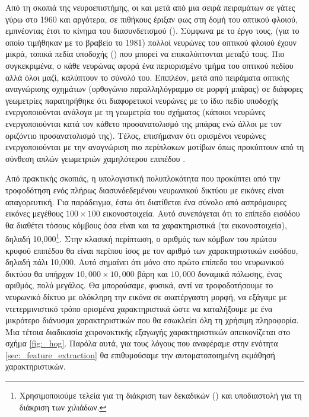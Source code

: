 Από τη σκοπιά της νευροεπιστήμης, οι  και  μετά από μια σειρά πειραμάτων σε γάτες \cite{hubel1959single, hubel1959receptive} γύρω στο 1960 και αργότερα, σε πιθήκους \cite{hubel1968receptive} έριξαν φως στη δομή του οπτικού φλοιού, εμπνέοντας έτσι το κίνημα του διασυνδετισμού (). Σύμφωνα με το έργο τους, (για το οποίο τιμήθηκαν με το βραβείο  το 1981) πολλοί νευρώνες του οπτικού φλοιού έχουν μικρά, τοπικά πεδία υποδοχής () που μπορεί να επικαλύπτονται μεταξύ τους. Πιο συγκεκριμένα, ο κάθε νευρώνας αφορά ένα περιορισμένο τμήμα του οπτικού πεδίου αλλά όλοι μαζί, καλύπτουν το σύνολό του. Επιπλέον, μετά από πειράματα οπτικής αναγνώρισης σχημάτων (ορθογώνιο παραλληλόγραμμο σε μορφή μπάρας) σε διάφορες γεωμετρίες παρατηρήθηκε ότι διαφορετικοί νευρώνες με το ίδιο πεδίο υποδοχής ενεργοποιούνται ανάλογα με τη γεωμετρία του σχήματος (κάποιοι νευρώνες ενεργοποιούνται κατά τον κάθετο προσανατολισμό της μπάρας ενώ άλλοι με τον οριζόντιο προσανατολισμό της). Τέλος, επισήμαναν ότι ορισμένοι νευρώνες ενεργοποιούνται με την αναγνώριση πιο περίπλοκων μοτίβων όπως προκύπτουν από τη σύνθεση απλών γεωμετριών χαμηλότερου επιπέδου \cite{geron2019hands}. \par
 
Από πρακτικής σκοπιάς, η υπολογιστική πολυπλοκότητα που προκύπτει από την τροφοδότηση ενός πλήρως διασυνδεδεμένου νευρωνικού δικτύου με εικόνες είναι απαγορευτική. Για παράδειγμα, έστω ότι διατίθεται ένα σύνολο από ασπρόμαυρες εικόνες μεγέθους $100 \times 100$ εικονοστοιχεία. Αυτό συνεπάγεται ότι το επίπεδο εισόδου θα διαθέτει τόσους κόμβους όσα είναι και τα χαρακτηριστικά (τα εικονοστοιχεία), δηλαδή 10,000\footnote{Χρησιμοποιούμε τελεία για τη διάκριση των δεκαδικών () και υποδιαστολή για τη διάκριση των χιλιάδων.}. Στην κλασική περίπτωση, ο αριθμός των κόμβων του πρώτου κρυφού επιπέδου θα είναι περίπου ίσος με τον αριθμό των χαρακτηριστικών εισόδου, δηλαδή πάλι 10,000. Αυτό σημαίνει ότι μόνο στο πρώτο επίπεδο του νευρωνικού δικτύου θα υπήρχαν $10,000 \times 10,000$ βάρη και $10,000$ δυναμικά πόλωσης, ένας αριθμός, πολύ μεγάλος. Θα μπορούσαμε, φυσικά, αντί να τροφοδοτήσουμε το νευρωνικό δίκτυο με ολόκληρη την εικόνα σε ακατέργαστη μορφή, να εξάγαμε με ντετερμινιστικό τρόπο ορισμένα χαρακτηριστικά ώστε να καταλήξουμε με ένα μικρότερο διάνυσμα χαρακτηριστικών που θα εσωκλείει όλη τη χρήσιμη πληροφορία. Μια τέτοια διαδικασία χειρονακτικής εξαγωγής χαρακτηριστικών απεικονίζεται στο σχήμα \ref{fig:_hog}. Παρόλα αυτά, για τους λόγους που αναφέραμε στην ενότητα \ref{sec:_feature_extraction} θα επιθυμούσαμε την αυτοματοποιημένη εκμάθησή χαρακτηριστικών.\par


